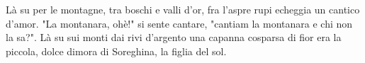 \chordsoff
\beginverse
Là su per le montagne, 
tra boschi e valli d'or, 
fra l'aspre rupi echeggia 
un cantico d'amor.
\endverse
\beginverse
"La montanara, ohè!" 
si sente cantare, 
"cantiam la montanara 
e chi non la sa?". 
\endverse
\beginverse
Là su sui monti dai rivi d'argento 
una capanna cosparsa di fior 
era la piccola, dolce dimora 
di Soreghina, la figlia del sol.
\endverse
\endsong
